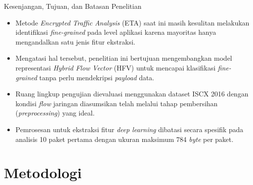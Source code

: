 \documentclass[
  aspectratio=169,
]{beamer}
\begin{document}
\begin{frame}{Kesenjangan, Tujuan, dan Batasan Penelitian}{}
\begin{itemize}
  \item Metode \textit{Encrypted Traffic Analysis} (ETA) saat ini masih kesulitan melakukan identifikasi \textit{fine-grained} pada level aplikasi karena mayoritas hanya mengandalkan satu jenis fitur ekstraksi.
  
  \item Mengatasi hal tersebut, penelitian ini bertujuan mengembangkan model representasi \textit{Hybrid Flow Vector} (HFV) untuk mencapai klasifikasi \textit{fine-grained} tanpa perlu mendekripsi \textit{payload} data.
  
  \item Ruang lingkup pengujian dievaluasi menggunakan dataset ISCX 2016 dengan kondisi \textit{flow} jaringan diasumsikan telah melalui tahap pembersihan (\textit{preprocessing}) yang ideal.
  
  \item Pemrosesan untuk ekstraksi fitur \textit{deep learning} dibatasi secara spesifik pada analisis 10 paket pertama dengan ukuran maksimum 784 \textit{byte} per paket.
\end{itemize}
\end{frame}

\section{Metodologi}
\end{document}
